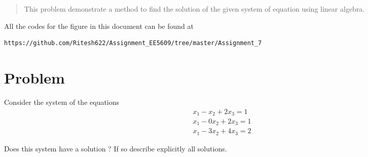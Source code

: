 \documentclass[journal,12pt,twocolumn]{IEEEtran}
\begin{document}
	
	\maketitle
	\newpage
	\bigskip
	\renewcommand{\thefigure}{\theenumi}
	\renewcommand{\thetable}{\theenumi}
	\date{Today}
	
\begin{abstract}
This problem demonstrate a method to  find the solution of the given system of equation using linear algebra.
\end{abstract}
All the codes for the figure in this document can be found at
\begin{lstlisting}
https://github.com/Ritesh622/Assignment_EE5609/tree/master/Assignment_7
\end{lstlisting}
\section{\textbf{Problem}}
Consider the system of the equations
\begin{align}
x_1 - x_2 +2x_3 = 1  \label{1.1} \\
x_1 - 0x_2 + 2x_3 = 1 \label{1.2} \\
x_1 -3x_2 + 4x_3 = 2 \label{1.3}
\end{align}

Does this system have a solution $?$  If   so describe explicitly all solutions.
\end{document}
